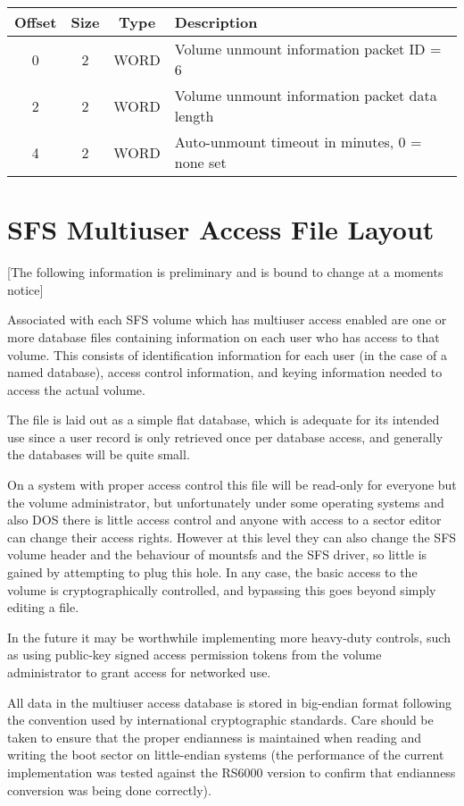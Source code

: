\begin{center}
\begin{tabular}{|c|c|c|l|}
\hline
    Offset & Size &  Type  &     Description\\
\hline
       0   &   2  &  WORD  &     Volume unmount information packet ID = 6\\
       2   &   2  &  WORD  &     Volume unmount information packet data length\\
       4   &   2  &  WORD  &     Auto-unmount timeout in minutes, 0 = none set\\
\hline
\end{tabular}
\end{center}


\section{SFS Multiuser Access File Layout}

[The following information is preliminary and is bound to change at a moments
 notice]

Associated with each SFS volume which has multiuser access enabled are one or
more database files containing information on each user who has access to that
volume.  This consists of identification information for each user (in the case
of a named database), access control information, and keying information needed
to access the actual volume.

The file is laid out as a simple flat database, which is adequate for its
intended use since a user record is only retrieved once per database access,
and generally the databases will be quite small.

On a system with proper access control this file will be read-only for everyone
but the volume administrator, but unfortunately under some operating systems
and also DOS there is little access control and anyone with access to a sector
editor can change their access rights.  However at this level they can also
change the SFS volume header and the behaviour of mountsfs and the SFS driver,
so little is gained by attempting to plug this hole.  In any case, the basic
access to the volume is cryptographically controlled, and bypassing this goes
beyond simply editing a file.

In the future it may be worthwhile implementing more heavy-duty controls, such 
as using public-key signed access permission tokens from the volume 
administrator to grant access for networked use.

All data in the multiuser access database is stored in big-endian format
following the convention used by international cryptographic standards.  Care
should be taken to ensure that the proper endianness is maintained when reading
and writing the boot sector on little-endian systems (the performance of the
current implementation was tested against the RS6000 version to confirm that
endianness conversion was being done correctly).

